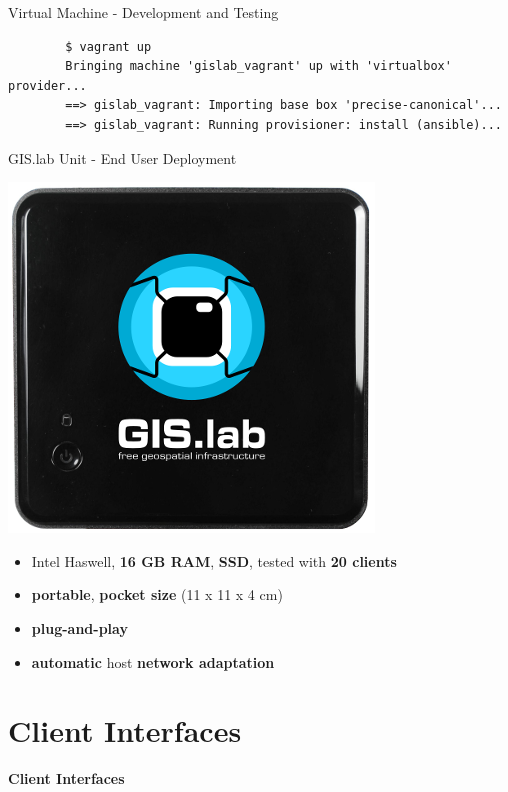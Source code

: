\documentclass[12pt]{beamer}
\begin{document}
\begin{frame}[fragile]{Virtual Machine - Development and Testing}
   \lstset{language=sh}
	\begin{lstlisting}
		$ vagrant up
		Bringing machine 'gislab_vagrant' up with 'virtualbox' provider...
		==> gislab_vagrant: Importing base box 'precise-canonical'...
		==> gislab_vagrant: Running provisioner: install (ansible)...
	\end{lstlisting}
\end{frame}

\begin{frame}{GIS.lab Unit - End User Deployment}
	\begin{center}
		\includegraphics[keepaspectratio=true,height=0.5\textheight]{images/gislab-unit.png}
	\end{center}
	\begin{itemize}
		\item Intel Haswell, \textbf{16 GB RAM}, \textbf{SSD}, tested with \textbf{20 clients}
		\item \textbf{portable}, \textbf{pocket size} (11 x 11 x 4 cm)
		\item \textbf{plug-and-play}
		\item \textbf{automatic} host \textbf{network adaptation}
	\end{itemize}
\end{frame}


\section{Client Interfaces}
\begin{frame}
	\begin{center}
		\LARGE\textbf{Client Interfaces}
	\end{center}
\end{frame}
\end{document}
